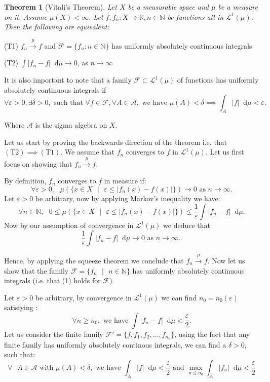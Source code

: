 \documentclass[11pt]{article}
\newcommand\st{\text{ } | \text{ }}
\newcommand\sthat{\text{ such that }}
\newcommand\R{\mathbb{R}}
\newcommand\N{\mathbb{N}}
\newcommand\Lmu{\mathcal{L}^1(\mu)}
\newcommand\A{\mathcal{A}}
\newcommand\weh{\text{ we have }}
\newcommand\as{\text{ as }}
\newcommand*\diff{\mathop{}\!\mathrm{d}}
\newtheorem*{theorem}{Theorem}
\begin{document}
\begin{theorem}[Vitali's Theorem]
  Let $X$ be a measurable space and $\mu$ be a measure on it. Assume $\mu(X)<\infty$.
  Let $f, f_n : X \to \R, n \in \N$ be functions all in $\Lmu$. Then
  the following are equivalent:
\end{theorem}
    \hspace{1cm} (T1) $f_n \xrightarrow{\mu} f $ and $ \mathcal{F} = \lbrace f_n : n \in \N\rbrace$ has uniformly absolutely continuous
     integrals

    \hspace{1cm} (T2) $\int |f_n - f| \diff\mu \to 0$, as $n \to \infty$

It is also important to note that a family $\mathcal{F} \subset \Lmu$ of functions
has uniformly absolutely continuous integrals if
\begin{equation}
  \forall \varepsilon > 0, \exists \delta > 0, \sthat  \forall f \in \mathcal{F},
  \forall A \in \mathcal{A}, \weh \mu(A) < \delta \implies \int_A |f|\diff \mu < \varepsilon.
\end{equation}

Where $\A$ is the sigma algebra on $X$.

Let us start by proving the backwards direction of the theorem i.e. that
$(\text{T}2) \implies (\text{T}1)$. We assume that  $f_n$ converges to  $f$ in  $\Lmu$.
Let us first focus on showing that  $f_n \xrightarrow{\mu} f$.

By definition, $f_n$ converges to  $f$ in measure if:
  \[
    \forall \varepsilon > 0,\text{ }  \mu \left(\lbrace x \in X \st
    \varepsilon \le |f_n(x) - f(x)|\rbrace\right) \to 0 \text{ as } n \to \infty
 .\]
Let $\varepsilon > 0$ be arbitrary, now by applying Markov's inequality we have:
\[
 \forall n \in \N, \text{ } 0 \le \mu \left(\lbrace x \in X \st
\varepsilon \le |f_n(x) - f(x)|\rbrace\right) \le \frac{1}{\varepsilon} \int |f_n - f|
\diff\mu
.\]
Now by our assumption of convergence in $\Lmu$ we deduce that
\[
\frac{1}{\varepsilon}\int |f_n - f| \diff\mu \to 0 \as n \to \infty.
.\]

Hence, by applying the squeeze theorem we conclude that $f_n \xrightarrow{\mu} f$.
Now let us show that the family $\mathcal{F} = \lbrace f_n \st n \in \N\rbrace $ has uniformly
absolutely continuous integrals (i.e. that (1) holds for $\mathcal{F})$.

Let $\varepsilon > 0$ be arbitrary, by convergence in $\Lmu$ we can find  $n_0 = n_0(\varepsilon)$
satisfying :
\[
\forall n \ge n_0, \weh \int |f_n - f| \diff\mu < \frac{\varepsilon}{2}
.\]
Let us consider the finite family $\mathcal{F}' = \lbrace f, f_1, f_2, \ldots, f_{n_0}\rbrace $,
using the fact that any finite family has uniformly absolutely continous integrals,
we can find a $\delta > 0$, such that:
\begin{equation}
  \forall \text{ } A \in \A \text{ with } \mu(A) < \delta, \weh \int_A |f| \diff\mu < \frac{\varepsilon}{2}
  \text{ and } \max_{n \le n_0}\int_A |f_n| \diff\mu < \frac{\varepsilon}{2}
\end{equation}
\end{document}
